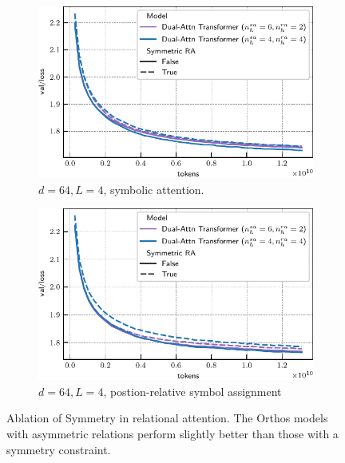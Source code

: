 \begin{figure}
    \centering
    \begin{subfigure}[t]{0.45\textwidth}
        \centering
        \includegraphics[width=\textwidth]{figs/experiments/tiny_stories/d64L4_ablation_symmetry_symmattn.pdf}
        \caption{$d = 64, L = 4$, symbolic attention.}
    \end{subfigure}
    \hfill
    \begin{subfigure}[t]{0.45\textwidth}
        \centering
        \includegraphics[width=\textwidth]{figs/experiments/tiny_stories/d64L4_ablation_symmetry_posrelsym.pdf}
        \caption{$d = 64, L = 4$, postion-relative symbol assignment}
    \end{subfigure}
    \caption{Ablation of Symmetry in relational attention. The Orthos models with asymmetric relations perform slightly better than those with a symmetry constraint.}\label{fig:ablation_symmetry}
\end{figure}


